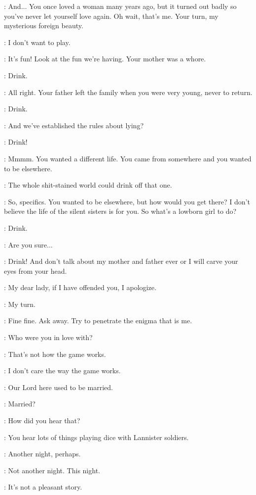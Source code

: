 \TYRION: And$\ldots$ You once loved a woman many years ago, but it turned out badly so you've never let yourself love again. Oh wait, that's me. Your turn, my mysterious foreign beauty. 

\SHAE: I don't want to play. 

\TYRION: It's fun! Look at the fun we're having. Your mother was a whore. 

\SHAE: Drink. 

\TYRION: All right. Your father left the family when you were very young, never to return. 

\SHAE: Drink. 

\TYRION: And we've established the rules about lying? 

\SHAE: Drink! 

\TYRION: Mmmm. You wanted a different life. You came from somewhere and you wanted to be elsewhere. 

\BRONN: The whole shit-stained world could drink off that one. 

\TYRION: So, specifics. You wanted to be elsewhere, but how would you get there? I don't believe the life of the silent sisters is for you. So what's a lowborn girl to do? 

\SHAE: Drink. 

\TYRION: Are you sure$\ldots$ 

\SHAE: Drink! And don't talk about my mother and father ever or I will carve your eyes from your head. 

\TYRION: My dear lady, if I have offended you, I apologize. 

\SHAE: My turn. 

\TYRION: Fine fine. Ask away. Try to penetrate the enigma that is me. 

\SHAE: Who were you in love with? 

\TYRION: That's not how the game works. 

\SHAE: I don't care the way the game works. 

\BRONN: Our Lord here used to be married. 

\SHAE: Married? 

\TYRION: How did you hear that? 

\BRONN: You hear lots of things playing dice with Lannister soldiers. 

\TYRION: Another night, perhaps. 

\SHAE: Not another night. This night. 

\TYRION: It's not a pleasant story. 

